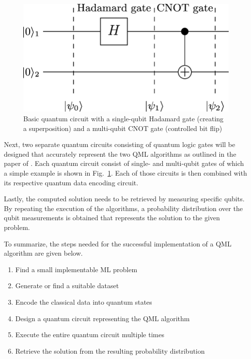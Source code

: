 \documentclass[a4paper]{article}
\newcommand*{\0}{$\ket{0}$}
\newcommand*{\1}{$\ket{1}$}
\begin{document}
\begin{figure}[!ht]
      \centering
       \includegraphics[scale=0.25]{qcircuit.png}
       \caption[caption for qcircuit]{\label{fig:qcircuit} Basic quantum circuit with a single-qubit Hadamard gate (creating a superposition) and a multi-qubit CNOT gate (controlled bit flip)\footnotemark[2]}
\end{figure}


Next, two separate quantum circuits consisting of quantum logic gates will be designed that accurately represent the two QML algorithms as outlined in the paper of \cite{Schuld2014, Schuld2016}. Each quantum circuit consist of single- and multi-qubit gates of which a simple example is shown in Fig.~\ref{fig:qcircuit}. Each of those circuits is then combined with its respective quantum data encoding circuit.

Lastly, the computed solution needs to be retrieved by measuring specific qubits. By repeating the execution of the algorithms, a probability distribution over the qubit measurements is obtained that represents the solution to the given problem.

To summarize, the steps needed for the successful implementation of a QML algorithm are given below.

\begin{enumerate}
\item Find a small implementable ML problem
\item Generate or find a suitable dataset
\item Encode the classical data into quantum states
\item Design a quantum circuit representing the QML algorithm
\item Execute the entire quantum circuit multiple times
\item Retrieve the solution from the resulting probability distribution
\end{enumerate}
\end{document}
